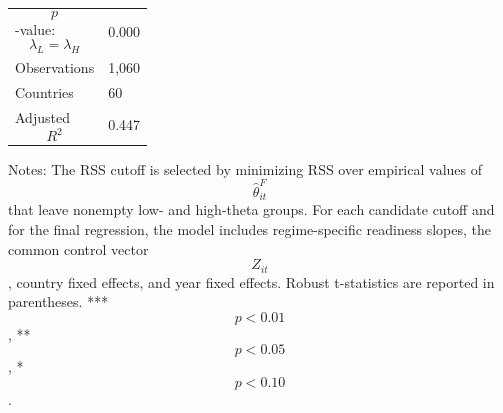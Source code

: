 \begin{table}[H]
\begin{threeparttable}
\begin{tabularx}{\textwidth}{lY}
$$p$$-value: $$\lambda_L=\lambda_H$$ & 0.000 \\
Observations & 1,060 \\
Countries & 60 \\
Adjusted $$R^2$$ & 0.447 \\
\bottomrule
\end{tabularx}
\begin{tablenotes}[flushleft]\footnotesize
\item Notes: The RSS cutoff is selected by minimizing RSS over empirical values of $$\widehat{\theta}^{F}_{it}$$ that leave nonempty low- and high-theta groups. For each candidate cutoff and for the final regression, the model includes regime-specific readiness slopes, the common control vector $$Z_{it}$$, country fixed effects, and year fixed effects. Robust t-statistics are reported in parentheses. *** $$p<0.01$$, ** $$p<0.05$$, * $$p<0.10$$.
\end{tablenotes}
\end{threeparttable}
\end{table}
